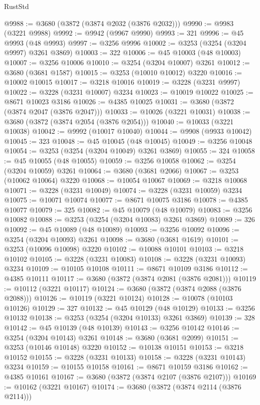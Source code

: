 \begin{lexlean}{RustStd}
\begin{coremodule}
@9988 := @3680 (@3872 (@3874 @2032 (@3876 @2032)))
@9990 := @9983 (@3221 @9988)
@9992 := @9942 (@9967 @9990)
@9993 := 321
@9996 := @45 @9993 (@48 @9993)
@9997 := @3256 @9996
@10002 := @3253 (@3254 (@3204 @9997) @3261 @3869)
@10003 := 322
@10006 := @45 @10003 (@48 @10003)
@10007 := @3256 @10006
@10010 := @3254 (@3204 @10007) @3261
@10012 := @3680 (@3681 @1587)
@10015 := @3253 (@10010 @10012) @3220
@10016 := @10002 @10015
@10017 := @3218 @10016
@10019 := @3228 (@3231 @9997)
@10022 := @3228 (@3231 @10007) @3234
@10023 := @10019 @10022
@10025 := @8671 @10023 @3186
@10026 := @4385 @10025
@10031 := @3680 (@3872 (@3874 @2047 (@3876 @2047)))
@10033 := @10026 (@3221 @10031)
@10038 := @3680 (@3872 (@3874 @2054 (@3876 @2054)))
@10040 := @10033 (@3221 @10038)
@10042 := @9992 (@10017 @10040)
@10044 := @9908 (@9933 @10042)
@10045 := 323
@10048 := @45 @10045 (@48 @10045)
@10049 := @3256 @10048
@10054 := @3253 (@3254 (@3204 @10049) @3261 @3869)
@10055 := 324
@10058 := @45 @10055 (@48 @10055)
@10059 := @3256 @10058
@10062 := @3254 (@3204 @10059) @3261
@10064 := @3680 (@3681 @2066)
@10067 := @3253 (@10062 @10064) @3220
@10068 := @10054 @10067
@10069 := @3218 @10068
@10071 := @3228 (@3231 @10049)
@10074 := @3228 (@3231 @10059) @3234
@10075 := @10071 @10074
@10077 := @8671 @10075 @3186
@10078 := @4385 @10077
@10079 := 325
@10082 := @45 @10079 (@48 @10079)
@10083 := @3256 @10082
@10088 := @3253 (@3254 (@3204 @10083) @3261 @3869)
@10089 := 326
@10092 := @45 @10089 (@48 @10089)
@10093 := @3256 @10092
@10096 := @3254 (@3204 @10093) @3261
@10098 := @3680 (@3681 @1619)
@10101 := @3253 (@10096 @10098) @3220
@10102 := @10088 @10101
@10103 := @3218 @10102
@10105 := @3228 (@3231 @10083)
@10108 := @3228 (@3231 @10093) @3234
@10109 := @10105 @10108
@10111 := @8671 @10109 @3186
@10112 := @4385 @10111
@10117 := @3680 (@3872 (@3874 @2081 (@3876 @2081)))
@10119 := @10112 (@3221 @10117)
@10124 := @3680 (@3872 (@3874 @2088 (@3876 @2088)))
@10126 := @10119 (@3221 @10124)
@10128 := @10078 (@10103 @10126)
@10129 := 327
@10132 := @45 @10129 (@48 @10129)
@10133 := @3256 @10132
@10138 := @3253 (@3254 (@3204 @10133) @3261 @3869)
@10139 := 328
@10142 := @45 @10139 (@48 @10139)
@10143 := @3256 @10142
@10146 := @3254 (@3204 @10143) @3261
@10148 := @3680 (@3681 @2099)
@10151 := @3253 (@10146 @10148) @3220
@10152 := @10138 @10151
@10153 := @3218 @10152
@10155 := @3228 (@3231 @10133)
@10158 := @3228 (@3231 @10143) @3234
@10159 := @10155 @10158
@10161 := @8671 @10159 @3186
@10162 := @4385 @10161
@10167 := @3680 (@3872 (@3874 @2107 (@3876 @2107)))
@10169 := @10162 (@3221 @10167)
@10174 := @3680 (@3872 (@3874 @2114 (@3876 @2114)))

\end{coremodule}
\end{lexlean}
